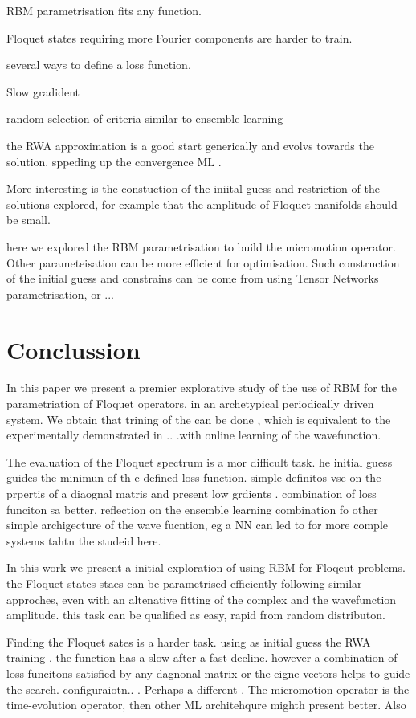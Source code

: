 \documentclass[pra,twocolumn,showkeys,preprintnumbers, amsmath,amssymb, aps,A4paper]{revtex4-1}
\begin{document}
RBM parametrisation fits any function.

Floquet states requiring more Fourier components are harder to train.

several ways to define a loss function.

Slow gradident

random selection of criteria similar to ensemble learning

the RWA approximation is a good start generically and evolvs towards the solution. sppeding up the  convergence ML .

More interesting is the constuction of the iniital guess and restriction of the solutions explored, for example that the amplitude of Floquet manifolds should be small.

here we explored the RBM parametrisation to build the micromotion operator. Other parameteisation  can be more efficient for optimisation. Such construction of the initial guess and constrains can be come from using Tensor Networks parametrisation, or ... 


\section{Conclussion}
In this paper we present a premier explorative study of the use of RBM for the parametriation of Floquet operators, in an archetypical periodically driven system. We obtain that trining of the can be done , which is equivalent to the experimentally demonstrated in .. .with online learning of the wavefunction.

The evaluation of the Floquet spectrum is a mor difficult task. he initial guess guides the minimun of th e defined loss function. simple definitos vse on the prpertis of a diaognal matris and present low grdients .  combination of loss funciton sa better, reflection on the ensemble learning combination fo other simple archigecture of the wave fucntion, eg a NN can led to for more comple systems tahtn the studeid here. 

In this work we present a initial exploration of using RBM for Floqeut problems. the Floquet states staes can be parametrised efficiently following similar approches, even with an altenative fitting of the complex and the wavefunction amplitude. this task can be qualified as easy, rapid from random distributon. 

Finding the Floquet sates is a harder task. using as initial guess the RWA training . the function has a slow after a fast decline. however a combination of loss funcitons satisfied by any dagnonal matrix  or the eigne vectors helps to guide the search. configuraiotn.. . Perhaps a different . The micromotion operator is the time-evolution operator, then other ML architehqure mighth present better. Also
\end{document}
